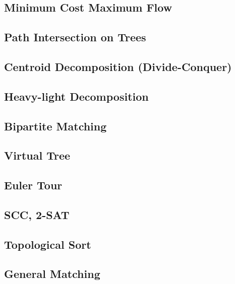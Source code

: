 \subsection{Minimum Cost Maximum Flow}
\raggedbottom
\hrulefill
\subsection{Path Intersection on Trees}
\raggedbottom
\hrulefill
\subsection{Centroid Decomposition (Divide-Conquer)}
\raggedbottom
\hrulefill
\subsection{Heavy-light Decomposition}
\raggedbottom
\hrulefill
\subsection{Bipartite Matching}
\raggedbottom
\hrulefill
\subsection{Virtual Tree}
\raggedbottom
\hrulefill
\subsection{Euler Tour}
\raggedbottom
\hrulefill
\subsection{SCC, 2-SAT}
\raggedbottom
\hrulefill
\subsection{Topological Sort}
\raggedbottom
\hrulefill
\subsection{General Matching}
\raggedbottom
\hrulefill
